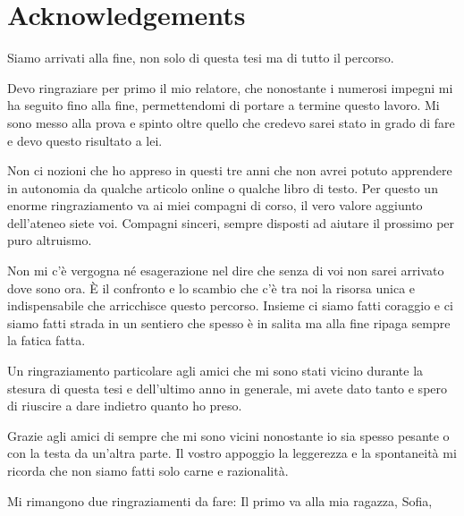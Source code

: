 \chapter*{Acknowledgements}
Siamo arrivati alla fine, non solo di questa tesi ma di tutto il percorso.

Devo ringraziare per primo il mio relatore, che nonostante i numerosi impegni mi ha seguito fino alla fine, permettendomi di portare a termine questo lavoro. Mi sono messo alla prova e spinto oltre quello che credevo sarei stato in grado di fare e devo questo risultato a lei.

Non ci nozioni che ho appreso in questi tre anni che non avrei potuto apprendere in autonomia da qualche articolo online o qualche libro di testo. Per questo un enorme ringraziamento va ai miei compagni di corso, il vero valore aggiunto dell'ateneo siete voi. Compagni sinceri, sempre disposti ad aiutare il prossimo per puro altruismo. 

Non mi c'è vergogna né esagerazione nel dire che senza di voi non sarei arrivato dove sono ora. È il confronto e lo scambio che c'è tra noi la risorsa unica e indispensabile che arricchisce questo percorso. Insieme ci siamo fatti coraggio e ci siamo fatti strada in un sentiero che spesso è in salita ma alla fine ripaga sempre la fatica fatta.

Un ringraziamento particolare agli amici che mi sono stati vicino durante la stesura di questa tesi e dell'ultimo anno in generale, mi avete dato tanto e spero di riuscire a dare indietro quanto ho preso.  

Grazie agli amici di sempre che mi sono vicini nonostante io sia spesso pesante o con la testa da un'altra parte. Il vostro appoggio la leggerezza e la spontaneità mi ricorda che non siamo fatti solo carne e razionalità.

Mi rimangono due ringraziamenti da fare:
Il primo va alla mia ragazza, Sofia,  

